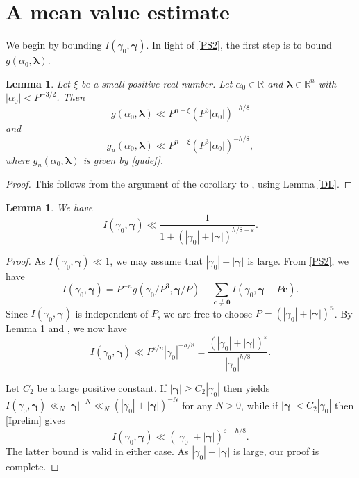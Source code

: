 \documentclass[12pt,reqno]{amsart}
\newtheorem{lemma}[thm]{Lemma}
\theoremstyle{definition}
\theoremstyle{remark}
\numberwithin{equation}{section}
\begin{document}
\section{A mean value estimate}
\label{MVE}

We begin by bounding $I({{\gamma}}_0,{\boldsymbol{{\gamma}}})$. In light of \eqref{PS2}, the first step is to bound $g({{\alpha}}_0, {{\boldsymbol {{\lambda}}}})$.

\begin{lemma} \label{gbound} 
Let $\xi$ be a small positive real number. Let ${{\alpha}}_0 \in {\mathbb R}$ and ${{\boldsymbol {{\lambda}}}} \in {\mathbb R}^n$ with $|{{\alpha}}_0| < P^{-3/2}$. Then
\[
g({{\alpha}}_0, {{\boldsymbol {{\lambda}}}}) \ll P^{n+\xi} (P^3 |{{\alpha}}_0|)^{-h/8}
\]
and
\[
g_u({{\alpha}}_0, {{\boldsymbol {{\lambda}}}}) \ll P^{n+\xi} (P^3 |{{\alpha}}_0|)^{-h/8},
\]
where $g_u({{\alpha}}_0, {{\boldsymbol {{\lambda}}}})$ is given by \eqref{gudef}.
\end{lemma}

\begin{proof}
This follows from the argument of the corollary to \cite[Lemma 4.3]{Bir1962}, using Lemma \ref{DL}.
\end{proof}

\begin{lemma} \label{Ibound}
We have
\begin{equation} \label{Iineq}
I({{\gamma}}_0,{\boldsymbol{{\gamma}}}) \ll \frac1 {1 + (|{{\gamma}}_0| + |{\boldsymbol{{\gamma}}}|)^{h/8-{\varepsilon}}}.
\end{equation}
\end{lemma}

\begin{proof}
As $I({{\gamma}}_0,{\boldsymbol{{\gamma}}}) \ll 1$, we may assume that $|{{\gamma}}_0| + |{\boldsymbol{{\gamma}}}|$ is large. From \eqref{PS2}, we have
\[
I({{\gamma}}_0,{\boldsymbol{{\gamma}}}) = P^{-n} g({{\gamma}}_0 / P^3, {\boldsymbol{{\gamma}}} / P) - \sum_{{\mathbf c} \ne {\mathbf 0}} I({{\gamma}}_0, {\boldsymbol{{\gamma}}} - P {\mathbf c}).
\]
Since $I({{\gamma}}_0,{\boldsymbol{{\gamma}}})$ is independent of $P$, we are free to choose $P = (|{{\gamma}}_0| + |{\boldsymbol{{\gamma}}}|)^n$. By Lemma \ref{gbound} and \cite[Lemma 10]{HB1996}, we now have
\begin{equation} \label{Iprelim}
I({{\gamma}}_0,{\boldsymbol{{\gamma}}}) \ll P^{{\varepsilon}/n} |{{\gamma}}_0|^{-h/8} = \frac{ (|{{\gamma}}_0| + |{\boldsymbol{{\gamma}}}|)^{\varepsilon}} { |{{\gamma}}_0|^{h/8}}.
\end{equation}

Let $C_2$ be a large positive constant. If $|{\boldsymbol{{\gamma}}}| {\geqslant} C_2 |{{\gamma}}_0|$ then \cite[Lemma 10]{HB1996} yields $I({{\gamma}}_0, {\boldsymbol{{\gamma}}}) \ll_N |{\boldsymbol{{\gamma}}}|^{-N} \ll_N (|{{\gamma}}_0| + |{\boldsymbol{{\gamma}}}|)^{-N}$ for any $N > 0$, while if $|{\boldsymbol{{\gamma}}}| < C_2 |{{\gamma}}_0|$ then \eqref{Iprelim} gives
\[
I({{\gamma}}_0, {\boldsymbol{{\gamma}}}) \ll (|{{\gamma}}_0| + |{\boldsymbol{{\gamma}}}|)^{{\varepsilon} - h/8}.
\]
The latter bound is valid in either case. As $|{{\gamma}}_0| + |{\boldsymbol{{\gamma}}}|$ is large, our proof is complete.
\end{proof}
\end{document}
